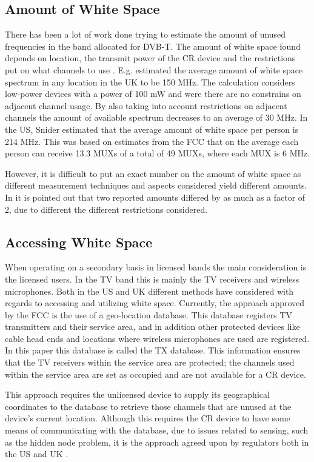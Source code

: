 \documentclass[journal,11pt,draftclsnofoot,onecolumn]{IEEEtran}
\begin{document}
\subsection{Amount of White Space}
There has been a lot of work done trying to estimate the amount of unused frequencies in the band allocated for DVB-T. The amount of white space found depends on location, the transmit power of the CR device and the restrictions put on what channels to use \cite{WS_UK,Mubaraq_1how,Scott06measuringthe}. E.g. \cite{surveyTV} estimated the average amount of white space spectrum in any location in the UK to be 150 MHz. The calculation considers low-power devices with a power of 100 mW and were there are no constrains on adjacent channel usage. By also taking into account restrictions on adjacent channels the amount of available spectrum decreases to an average of 30 MHz. In the US, Snider estimated that the average amount of white space per person is 214 MHz\cite{snider}. This was based on estimates from the FCC that on the average each person can receive 13.3 MUXs of a total of 49 MUXs, where each MUX is 6 MHz.

However, it is difficult to put an exact number on the amount of white space as different measurement techniques and aspects considered yield different amounts. In \cite{harrison} it is pointed out that two reported amounts differed by as much as a factor of 2, due to different the different restrictions considered.

\subsection{Accessing White Space}
When operating on a secondary basis in licensed bands the main consideration is the licensed users. In the TV band this is mainly the TV receivers and wireless microphones. Both in the US and UK different methods have considered with regards to accessing and utilizing white space. Currently, the approach approved by the FCC is the use of a geo-location database. This database registers TV transmitters and their service area, and in addition other protected devices like cable head ends and locations where wireless microphones are used are registered. In this paper this database is called the TX database. This information ensures that the TV receivers within the service area are protected; the channels used within the service area are set as occupied and are not available for a CR device. 

This approach requires the unlicensed device to supply its geographical coordinates to the database to retrieve those channels that are unused at the device's current location. Although this requires the CR device to have some means of communicating with the database, due to issues related to sensing, such as the hidden node problem, it is the approach agreed upon by regulators both in the US and UK \cite{FCC_2010,ofcom_2009}.
\end{document}
